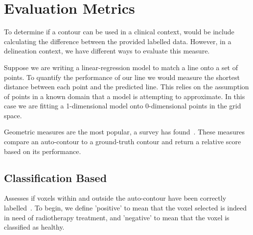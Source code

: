 \documentclass[12pt,twoside]{report}
\begin{document}



\chapter{Evaluation Metrics}\label{sect:evaluation-metrics}

To determine if a contour can be used in a clinical context, would be include calculating the difference between the provided labelled data. However, in a delineation context, we have different ways to evaluate this measure.

Suppose we are writing a linear-regression model to match a line onto a set of points. To quantify the performance of our line we would measure the shortest distance between each point and the predicted line. This relies on the assumption of points in a known domain that a model is attempting to approximate. In this case we are fitting a 1-dimensional model onto 0-dimensional points in the grid space.


Geometric measures are the most popular, a survey has found~\cite{review-metrics}. These measures compare an auto-contour to a ground-truth contour and return a relative score based on its performance.

\section{Classification Based}\label{sect:classification-based}

Assesses if voxels within and outside the auto-contour have been correctly labelled~\cite{review-metrics}. To begin, we define 'positive' to mean that the voxel selected is indeed in need of radiotherapy treatment, and 'negative' to mean that the voxel is classified as healthy.
\end{document}
